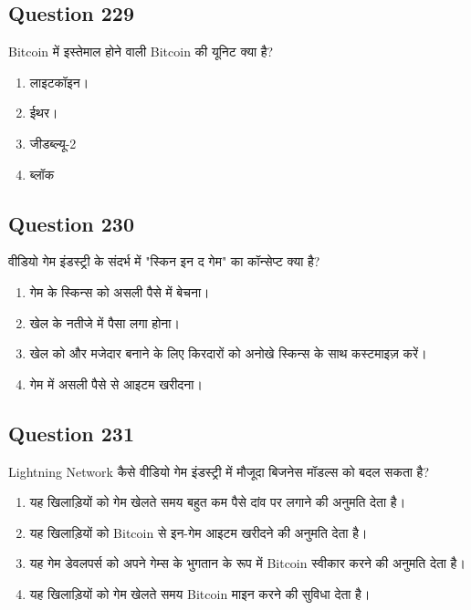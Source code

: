\documentclass[12pt,a4paper]{article}
\begin{document}
\bigskip


\subsection*{Question 229}
Bitcoin में इस्तेमाल होने वाली Bitcoin की यूनिट क्या है?

\begin{enumerate}[label=\Alph*., leftmargin=*]
\item लाइटकॉइन।
\item ईथर।
\item जीडब्ल्यू-2
\item ब्लॉक
\end{enumerate}

\bigskip


\subsection*{Question 230}
वीडियो गेम इंडस्ट्री के संदर्भ में "स्किन इन द गेम" का कॉन्सेप्ट क्या है?

\begin{enumerate}[label=\Alph*., leftmargin=*]
\item गेम के स्किन्स को असली पैसे में बेचना।
\item खेल के नतीजे में पैसा लगा होना।
\item खेल को और मजेदार बनाने के लिए किरदारों को अनोखे स्किन्स के साथ कस्टमाइज़ करें।
\item गेम में असली पैसे से आइटम खरीदना।
\end{enumerate}

\bigskip


\subsection*{Question 231}
Lightning Network कैसे वीडियो गेम इंडस्ट्री में मौजूदा बिजनेस मॉडल्स को बदल सकता है?

\begin{enumerate}[label=\Alph*., leftmargin=*]
\item यह खिलाड़ियों को गेम खेलते समय बहुत कम पैसे दांव पर लगाने की अनुमति देता है।
\item यह खिलाड़ियों को Bitcoin से इन-गेम आइटम खरीदने की अनुमति देता है।
\item यह गेम डेवलपर्स को अपने गेम्स के भुगतान के रूप में Bitcoin स्वीकार करने की अनुमति देता है।
\item यह खिलाड़ियों को गेम खेलते समय Bitcoin माइन करने की सुविधा देता है।
\end{enumerate}
\end{document}
